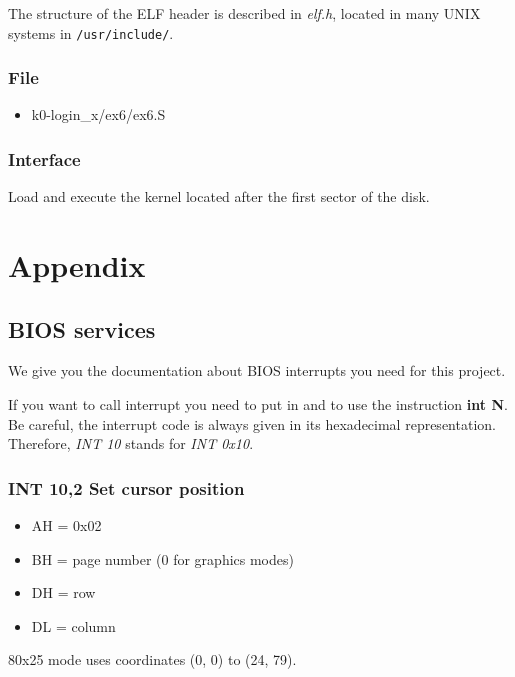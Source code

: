The structure of the ELF header is described in \emph{elf.h}, located in many
UNIX systems in \verb+/usr/include/+.

\subsection*{File}
\begin{itemize}
  \item k0-login\_x/ex6/ex6.S
\end{itemize}

\subsection*{Interface}
{
  Load and execute the kernel located after the first sector of the disk.
}

%
%

\chapter{Appendix}

%
%

\section{BIOS services}

We give you the documentation about BIOS interrupts you need for this
project.

If you want to call interrupt  you need to put  in
 and to use the instruction \textbf{int N}. Be careful, the
interrupt code is always given in its hexadecimal representation. Therefore,
\emph{INT 10} stands for \emph{INT 0x10}.

%
%
\subsection{INT 10,2 Set cursor position}
\begin{itemize}
  \item{AH = 0x02}
  \item{BH = page number (0 for graphics modes)}
  \item{DH = row}
  \item{DL = column}
\end{itemize}

80x25 mode uses coordinates (0, 0) to (24, 79).

